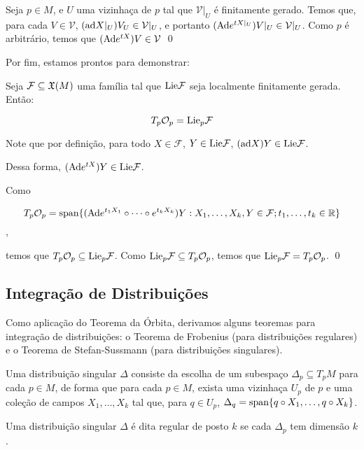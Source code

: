 \dem Seja $p \in M$, e $U$ uma vizinhaça de $p$ tal que $\mathcal{V}|_U$ é finitamente
gerado. Temos que, para cada $V \in \mathcal{V}$, $(\text{ad} X|_U) V_U \in \mathcal{V}|_U$,
e portanto $(\text{Ad} e^{tX|_U})V|_U \in \mathcal{V}|_U$. Como $p$ é arbitrário,
temos que $(\text{Ad} e^{tX})V \in \mathcal{V}$ \qed

Por fim, estamos prontos para demonstrar:

\begin{theorem}
    Seja $\mathcal{F} \subseteq \mathfrak{X}(M)$ uma família tal que $\text{Lie} \mathcal{F}$ seja
    localmente finitamente gerada. Então:

    $$T_p\mathcal{O}_p = \text{Lie}_p \mathcal{F}$$
\end{theorem}

\dem Note que por definição, para todo $X \in \mathcal{F}$, $Y \in \text{Lie} \mathcal{F}$,
$(\text{ad} X) Y \in \text{Lie} \mathcal{F}$.

Dessa forma, $(\text{Ad} e^{tX}) Y \in \text{Lie} \mathcal{F}$.

Como

$$T_p\mathcal{O}_p= \text{span}\{(\text{Ad} e^{t_1X_1}\circ \dots \circ e^{t_kX_k}) Y : X_1,\dots,X_k, Y \in \mathcal{F} ; t_1,\dots,t_k \in \mathbb{R}\}$$,

temos que $T_p\mathcal{O}_p \subseteq \text{Lie}_p\mathcal{F}$. Como
$\text{Lie}_p\mathcal{F} \subseteq T_p\mathcal{O}_p$, temos que $\text{Lie}_p\mathcal{F} = T_p\mathcal{O}_p$. \qed



\subsection{Integração de Distribuições} Como aplicação do Teorema da Órbita, derivamos
alguns teoremas para integração de distribuições: o Teorema de Frobenius (para distribuições regulares)
e o Teorema de Stefan-Sussmann (para distribuições singulares).

\begin{definition}
    Uma distribuição singular $\Delta$ consiste da escolha de um subespaço
$\Delta_p \subseteq T_p M$ para cada $p \in M$, de forma que para cada $p \in M$,
exista uma vizinhaça $U_p$ de $p$ e uma coleção de campos $X_1, \dots, X_k$
tal que, para $q \in U_p$, $\Delta_q = \text{span}\{q\circ X_1,\dots,q \circ X_k\}$.
\end{definition}

\begin{definition}
    Uma distribuição singular $\Delta$ é dita regular de posto $k$ se
    cada $\Delta_p$ tem dimensão $k$.
\end{definition}

